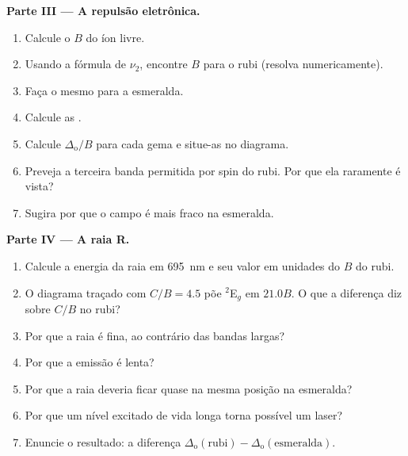 \begin{problem}
\medskip\noindent\textbf{Parte III --- A repulsão eletrônica.}
\begin{enumerate}[resume]
  \item Calcule o $B$ do íon livre.
  \item Usando a fórmula de $\nu_2$, encontre $B$ para o rubi (resolva numericamente).
  \item Faça o mesmo para a esmeralda.
  \item Calcule as .
  \item Calcule $\Delta_{\mathrm o}/B$ para cada gema e situe-as no diagrama.
  \item Preveja a terceira banda permitida por spin do rubi. Por que ela raramente é vista?
  \item Sugira por que o campo é mais fraco na esmeralda.
\end{enumerate}

\medskip\noindent\textbf{Parte IV --- A raia R.}
\begin{enumerate}[resume]
  \item Calcule a energia da raia em \qty{695}{nm} e seu valor em unidades do $B$ do rubi.
  \item O diagrama traçado com $C/B = 4.5$ põe $^2$E$_g$ em $21.0B$. O que a diferença
        diz sobre $C/B$ no rubi?
  \item Por que a raia é fina, ao contrário das bandas largas?
  \item Por que a emissão é lenta?
  \item Por que a raia deveria ficar quase na mesma posição na esmeralda?
  \item Por que um nível excitado de vida longa torna possível um laser?
  \item Enuncie o resultado: a diferença $\Delta_{\mathrm o}(\text{rubi}) - \Delta_{\mathrm o}(\text{esmeralda})$.
\end{enumerate}
\end{problem}

